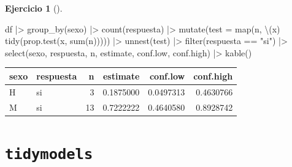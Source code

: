 \documentclass[
  a4paper,
]{scrreport}
\newenvironment{Shaded}{\begin{snugshade}}{\end{snugshade}}
\newcommand{\AttributeTok}[1]{\textcolor[rgb]{0.40,0.45,0.13}{#1}}
\newcommand{\FunctionTok}[1]{\textcolor[rgb]{0.28,0.35,0.67}{#1}}
\newcommand{\NormalTok}[1]{\textcolor[rgb]{0.00,0.23,0.31}{#1}}
\newcommand{\SpecialCharTok}[1]{\textcolor[rgb]{0.37,0.37,0.37}{#1}}
\newcommand{\StringTok}[1]{\textcolor[rgb]{0.13,0.47,0.30}{#1}}
\theoremstyle{definition}
\newtheorem{exercise}{Ejercicio}[chapter]
\theoremstyle{remark}
\begin{document}
\begin{exercise}[]
\begin{enumerate}
\begin{tcolorbox}
\begin{Shaded}
\begin{Highlighting}[]
\NormalTok{df }\SpecialCharTok{|\textgreater{}} 
    \FunctionTok{group\_by}\NormalTok{(sexo) }\SpecialCharTok{|\textgreater{}} 
    \FunctionTok{count}\NormalTok{(respuesta) }\SpecialCharTok{|\textgreater{}} 
    \FunctionTok{mutate}\NormalTok{(}\AttributeTok{test =} \FunctionTok{map}\NormalTok{(n, \textbackslash{}(x) }\FunctionTok{tidy}\NormalTok{(}\FunctionTok{prop.test}\NormalTok{(x, }\FunctionTok{sum}\NormalTok{(n))))) }\SpecialCharTok{|\textgreater{}}     
    \FunctionTok{unnest}\NormalTok{(test) }\SpecialCharTok{|\textgreater{}}
    \FunctionTok{filter}\NormalTok{(respuesta }\SpecialCharTok{==} \StringTok{"si"}\NormalTok{) }\SpecialCharTok{|\textgreater{}} 
    \FunctionTok{select}\NormalTok{(sexo, respuesta, n, estimate, conf.low, conf.high) }\SpecialCharTok{|\textgreater{}}  
    \FunctionTok{kable}\NormalTok{() }
\end{Highlighting}
\end{Shaded}

  \begin{longtable}[]{@{}llrrrr@{}}
  \toprule\noalign{}
  sexo & respuesta & n & estimate & conf.low & conf.high \\
  \midrule\noalign{}
  \endhead
  \bottomrule\noalign{}
  \endlastfoot
  H & si & 3 & 0.1875000 & 0.0497313 & 0.4630766 \\
  M & si & 13 & 0.7222222 & 0.4640580 & 0.8928742 \\
  \end{longtable}

  \section{\texorpdfstring{\texttt{tidymodels}}{tidymodels}}


\end{tcolorbox}
\end{enumerate}
\end{exercise}
\end{document}
